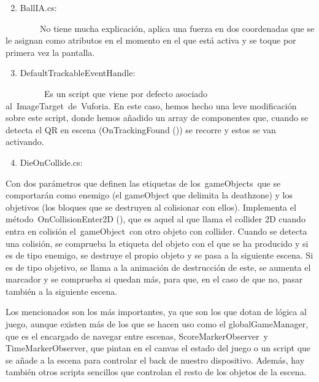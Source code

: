 \documentclass[]{article}
\begin{document}
\begin{enumerate}
\setcounter{enumi}{1}
\itemsep1pt\parskip0pt
\item
  BallIA.cs:
\end{enumerate}

~~~~~~~~No tiene mucha explicación, aplica una fuerza en dos coordenadas
que se le asignan como atributos en el momento en el que está activa y
se toque por primera vez la pantalla.

\begin{enumerate}
\setcounter{enumi}{2}
\itemsep1pt\parskip0pt
\item
  DefaultTrackableEventHandle:
\end{enumerate}

~~~~~~~~~Es un script que viene por defecto asociado
al~ImageTarget~de~Vuforia. En este caso, hemos hecho una leve
modificación sobre este script, donde hemos añadido un array de
componentes que, cuando se detecta el QR en escena (OnTrackingFound ())
se recorre y estos se van activando.

\begin{enumerate}
\setcounter{enumi}{3}
\itemsep1pt\parskip0pt
\item
  DieOnCollide.cs:
\end{enumerate}

Con dos parámetros que definen las etiquetas de los~gameObjects~que se
comportarán como enemigo (el gameObject que delimita la deathzone) y los
objetivos (los bloques que se destruyen al colisionar con ellos).
Implementa el método~OnCollisionEnter2D (), que es aquel al que llama el
collider 2D cuando entra en colisión el~gameObject~con otro objeto con
collider. Cuando se detecta una colisión, se comprueba la etiqueta del
objeto con el que se ha producido y si es de tipo enemigo, se destruye
el propio objeto y se pasa a la siguiente escena. Si es de tipo
objetivo, se llama a la animación de destrucción de este, se aumenta el
marcador y se comprueba si quedan más, para que, en el caso de que no,
pasar también a la siguiente escena.

Los mencionados son los más importantes, ya que son los que dotan de
lógica al juego, aunque existen más de los que se hacen uso como el
globalGameManager, que es el encargado de navegar entre escenas,
ScoreMarkerObserver~y TimeMarkerObserver, que pintan en el canvas el
estado del juego o un script que se añade a la escena para controlar el
back de nuestro dispositivo. Además, hay también otros scripts sencillos
que controlan el resto de los objetos de la escena.
\end{document}
